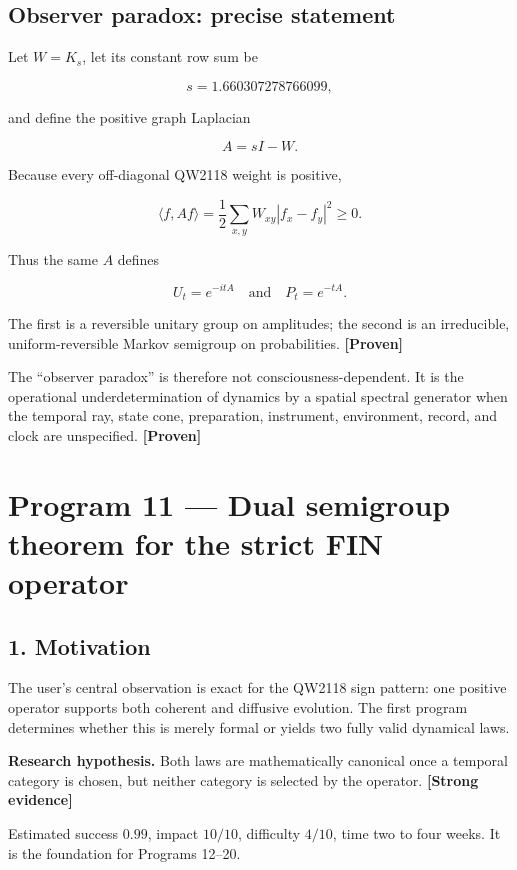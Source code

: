 \documentclass[11pt,a4paper,openany]{report}
\newcommand{\statusProven}{\textcolor{fingreen}{[Proven]}}
\newcommand{\statusStrong}{\textcolor{finblue}{[Strong evidence]}}
\begin{document}
\section{Observer paradox: precise statement}

Let \(W=K_s\), let its constant row sum be

\[
s=1.660307278766099,
\]

and define the positive graph Laplacian

\[
A=sI-W.
\]

Because every off-diagonal QW2118 weight is positive,

\[
\langle f,Af\rangle
=\frac12\sum_{x,y}W_{xy}|f_x-f_y|^2\ge0.
\]

Thus the same \(A\) defines

\[
U_t=e^{-itA}
\quad\text{and}\quad
P_t=e^{-tA}.
\]

The first is a reversible unitary group on amplitudes; the second is an irreducible, uniform-reversible Markov semigroup on probabilities. \textbf{\statusProven{}}

The “observer paradox” is therefore not consciousness-dependent. It is the operational underdetermination of dynamics by a spatial spectral generator when the temporal ray, state cone, preparation, instrument, environment, record, and clock are unspecified. \textbf{\statusProven{}}

\chapter{Program 11 — Dual semigroup theorem for the strict FIN operator}

\section{1. Motivation}

The user's central observation is exact for the QW2118 sign pattern: one positive operator supports both coherent and diffusive evolution. The first program determines whether this is merely formal or yields two fully valid dynamical laws.

\textbf{Research hypothesis.} Both laws are mathematically canonical once a temporal category is chosen, but neither category is selected by the operator. \textbf{\statusStrong{}}

Estimated success \(0.99\), impact \(10/10\), difficulty \(4/10\), time two to four weeks. It is the foundation for Programs 12–20.
\end{document}
